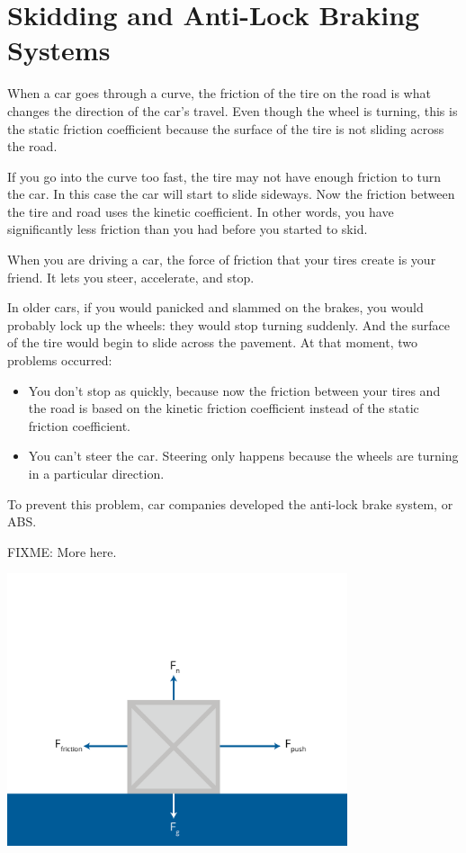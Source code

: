 \section{Skidding and Anti-Lock Braking Systems}

When a car goes through a curve, the friction of the tire on the road is what changes the direction of the 
car's travel. Even though the wheel is turning, this is the static friction coefficient because the surface of the tire is not sliding across the road.

If you go into the curve too fast,  the tire may not have enough friction to turn the car.  In this case the car will start to slide sideways. Now the friction between the tire and road uses the kinetic coefficient. In other words, you have significantly less friction than you had before you started to skid.

When you are driving a car,  the force of friction that your tires create is your friend.  It lets you steer, accelerate, and stop.

In older cars,  if you would panicked  and slammed on the brakes,  you would probably lock up the wheels: they would stop turning suddenly.  And the surface of the tire would begin to slide across the pavement.  At that moment,  two problems occurred:
\begin{itemize}
\item You don't stop as quickly, because now the friction between your tires and the road is based on the kinetic friction coefficient instead of the static friction coefficient.
\item You can't steer the car. Steering only happens because the wheels are turning in a particular direction.
\end{itemize}

To prevent this problem, car companies developed the anti-lock brake system, or ABS.

FIXME: More here.

\includegraphics[width=0.75\textwidth]{friction-01.png}

